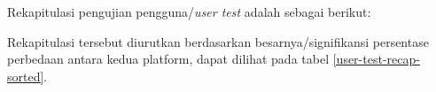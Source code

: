 Rekapitulasi pengujian pengguna/\textit{user test} adalah sebagai berikut:


\indent Rekapitulasi tersebut diurutkan berdasarkan besarnya/signifikansi persentase perbedaan antara kedua platform, dapat dilihat pada tabel \ref{user-test-recap-sorted}.

